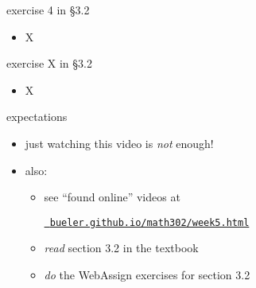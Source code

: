 \documentclass{beamer}
\begin{document}
\begin{frame}{exercise 4 in \S3.2}

\begin{itemize}
\item X
\end{itemize}
\end{frame}


\begin{frame}{exercise X in \S3.2}

\begin{itemize}
\item X
\end{itemize}
\end{frame}


\begin{frame}{expectations}

\begin{itemize}
\item just watching this video is \emph{not} enough!

\item also:
     \begin{itemize}
     \item see ``found online'' videos at

     \centerline{\href{https://bueler.github.io/math302/week5.html}{\tt \color{cyan} bueler.github.io/math302/week5.html}}
     \item \emph{read} section 3.2 in the textbook
     \item \emph{do} the WebAssign exercises for section 3.2
     \end{itemize}
\end{itemize}
\end{frame}
\end{document}
